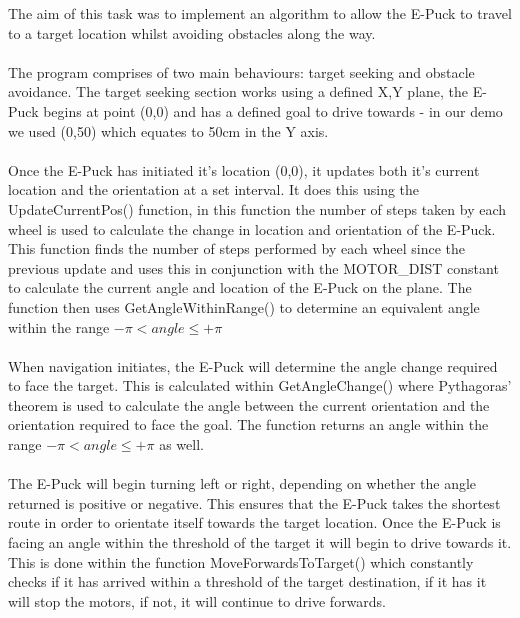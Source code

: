 \documentclass[11pt]{article}
\begin{document}
The aim of this task was to implement an algorithm to allow the E-Puck to travel to a target location whilst avoiding obstacles along the way. 
\\
\\
The program comprises of two main behaviours: target seeking and obstacle avoidance. The target seeking section works using a defined X,Y plane, the E-Puck begins at point (0,0) and has a defined goal to drive towards - in our demo we used (0,50) which equates to 50cm in the Y axis.
\\
\\
Once the E-Puck has initiated it's location (0,0), it updates both it's current location and the orientation at a set interval. It does this using the UpdateCurrentPos() function, in this function the number of steps taken by each wheel is used to calculate the change in location and orientation of the E-Puck. This function finds the number of steps performed by each wheel since the previous update and uses this in conjunction with the MOTOR\_DIST constant to calculate the current angle and location of the E-Puck on the plane. The function then uses GetAngleWithinRange() to determine an equivalent angle within the range \begin{math}-\pi < angle \leq +\pi\end{math}
\\
\\
When navigation initiates, the E-Puck will determine the angle change required to face the target. This is calculated within GetAngleChange() where Pythagoras' theorem is used to calculate the angle between the current orientation and the orientation required to face the goal. The function returns an angle within the range \begin{math}-\pi < angle \leq +\pi\end{math} as well.
\\
\\
The E-Puck will begin turning left or right, depending on whether the angle returned is positive or negative. This ensures that the E-Puck takes the shortest route in order to orientate itself towards the target location. Once the E-Puck is facing an angle within the threshold of the target it will begin to drive towards it. This is done within the function MoveForwardsToTarget() which constantly checks if it has arrived within a threshold of the target destination, if it has it will stop the motors, if not, it will continue to drive forwards.
\\
\\
\end{document}
